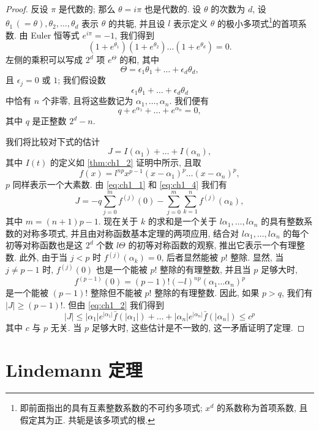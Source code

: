 \begin{proof}
反设 $\pi$ 是代数的; 那么 $\theta = i\pi$ 也是代数的. 设 $\theta$ 的次数为 $d$, 设 $\theta_1 \,(=\theta), \theta_2, \dots, \theta_d$ 表示 $\theta$ 的共轭, 并且设 $l$ 表示定义 $\theta$ 的极小多项式\footnote{即前面指出的具有互素整数系数的不可约多项式; $x^d$ 的系数称为首项系数, 且假定其为正. 共轭是该多项式的根.}的首项系数. 由 Euler 恒等式 $e^{i\pi} = -1$, 我们得到
\[
(1+e^{\theta_1})(1+e^{\theta_2})\dots(1+e^{\theta_d})=0.
\]
左侧的乘积可以写成 $2^d$ 项 $e^{\Theta}$ 的和, 其中
\[
\Theta = \epsilon_1 \theta_1 + \dots + \epsilon_d \theta_d,
\]
且 $\epsilon_j = 0$ 或 $1$; 我们假设数
\[
\epsilon_1 \theta_1 + \dots + \epsilon_d \theta_d
\]
中恰有 $n$ 个非零, 且将这些数记为 $\alpha_1, \dots, \alpha_n$. 我们便有
\begin{equation} \label{eq:ch1_4}\tag{4}
q + e^{\alpha_1} + \dots + e^{\alpha_n} = 0,
\end{equation}
其中 $q$ 是正整数 $2^d - n$.

我们将比较对下式的估计
\[
J = I(\alpha_1) + \dots + I(\alpha_n),
\]
其中 $I(t)$ 的定义如 \autoref{thm:ch1_2} 证明中所示, 且取
\[
f(x) = l^{np} x^{p-1} (x-\alpha_1)^p \dots (x-\alpha_n)^p,
\]
$p$ 同样表示一个大素数. 由 \eqref{eq:ch1_1} 和 \eqref{eq:ch1_4} 我们有
\[
J = -q \sum_{j=0}^{m} f^{(j)}(0) - \sum_{j=0}^{m} \sum_{k=1}^{n} f^{(j)}(\alpha_k),
\]
其中 $m = (n+1)p - 1. $ 现在关于 $k$ 的求和是一个关于 $l\alpha_1, \dots, l\alpha_n$ 的具有整数系数的对称多项式, 并且由对称函数基本定理的两项应用, 结合对 $l\alpha_1, \dots, l\alpha_n$ 的每个初等对称函数也是这 $2^d$ 个数 $l\Theta$ 的初等对称函数的观察, 推出它表示一个有理整数. 此外, 由于当 $j < p$ 时 $f^{(j)}(\alpha_k)=0$, 后者显然能被 $p!$ 整除. 显然, 当 $j \neq p-1$ 时, $f^{(j)}(0)$ 也是一个能被 $p!$ 整除的有理整数, 并且当 $p$ 足够大时,
\[
f^{(p-1)}(0) = (p-1)! (-l)^{np} (\alpha_1 \dots \alpha_n)^p
\]
是一个能被 $(p-1)!$ 整除但不能被 $p!$ 整除的有理整数. 因此, 如果 $p > q$, 我们有 $|J| \ge (p-1)!$. 但由 \eqref{eq:ch1_2} 我们得到
\[
|J| \le |\alpha_1| e^{|\alpha_1|} \bar{f}(|\alpha_1|) + \dots + |\alpha_n| e^{|\alpha_n|} \bar{f}(|\alpha_n|) \le c^p
\]
其中 $c$ 与 $p$ 无关. 当 $p$ 足够大时, 这些估计是不一致的, 这一矛盾证明了定理.
\end{proof}


\section{Lindemann 定理}

